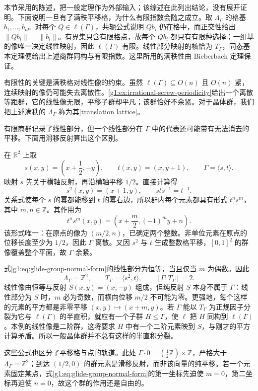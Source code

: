 本节采用\cite[第2节，定义1、命题1及其后说明，第68--69页]{Burde2021Crystallographic}的陈述，把一般定理作为外部输入；该综述在此列出结论，没有展开证明。下面说明一旦有了满秩平移格，为什么有限指数会随之成立。取 \(\Lambda_\Gamma\) 的格基 \(b_1,\ldots,b_n\)。对每个 \(Q\in\ell(\Gamma)\)，共轭公式说明 \(Qb_i\) 仍在格中，而正交性给出 \(\lVert Qb_i\rVert=\lVert b_i\rVert\)。有界集只含有限格点，故每个 \(Qb_i\) 都只有有限种选择；一组基的像唯一决定线性映射，因此 \(\ell(\Gamma)\) 有限。线性部分映射的核恰为 \(T_\Gamma\)，同态基本定理便给出上述商群同构与有限指数。这里所用的满秩性由 Bieberbach 定理保证。

\ProseParagraphBreak

有限性的关键是满秩格对线性像的约束。虽然 \(\ell(\Gamma)\subseteq O(n)\) 且 \(O(n)\) 紧，连续映射的像仍可能失去离散性。\cref{g1:ex:irrational-screw-periodicity}给出一个离散等距群，它的线性像无限，平移子群却平凡；该群恰好不余紧。对于晶体群，我们把上述满秩的 \(\Lambda_\Gamma\) 称为其[translation lattice]。

\ProseParagraphBreak

有限商群记录了线性部分，但一个线性部分在 \(\Gamma\) 中的代表还可能带有无法消去的平移。下面用滑移反射算出这个区别。

\begin{example}
	\label{g1:exm:glide-crystallographic}
	在 \(\mathbb R^2\) 上取
	\[
		s(x,y)=\left(x+\frac12,-y\right),\qquad t(x,y)=(x,y+1),
		\qquad \Gamma=\langle s,t\rangle.
	\]
	映射 \(s\) 先关于横轴反射，再沿横轴平移 \(1/2\)。直接计算得
	\[
		s^2(x,y)=(x+1,y),\qquad sts^{-1}=t^{-1}.
	\]
	关系式使每个 \(s\) 的幂都能移到 \(t\) 的幂右边，所以群内每个元素都具有形式 \(t^ns^m\)，其中 \(m,n\in\mathbb Z\)。其作用为
	\begin{equation}\label{g1:eq:glide-group-normal-form}
		t^ns^m(x,y)=\left(x+\frac m2,(-1)^m y+n\right).
	\end{equation}
	该形式唯一：在原点的像为 \((m/2,n)\)，已确定两个整数。非单位元素在原点的位移长度至少为 \(1/2\)，因此 \(\Gamma\) 离散。又因 \(s^2\) 与 \(t\) 生成整数格平移，\([0,1]^2\) 的群像覆盖整个平面，故 \(\Gamma\) 余紧。

	式\eqref{g1:eq:glide-group-normal-form}的线性部分为恒等，当且仅当 \(m\) 为偶数。因此
	\[
		\Lambda_\Gamma=\mathbb Z^2,\qquad
		T_\Gamma=\langle s^2,t\rangle,\qquad
		[\Gamma:T_\Gamma]=2.
	\]
	线性像由恒等与反射 \(S(x,y)=(x,-y)\) 组成，但纯反射 \(S\) 本身不属于 \(\Gamma\)：线性部分为 \(S\) 时，\(m\) 必为奇数，而横向位移 \(m/2\) 不可能为零。更强地，每个这样的元素的平方都是非零平移 \((x,y)\mapsto(x+m,y)\)。若 \(\Gamma\) 能以 \(T_\Gamma\) 为正规因子分裂为它与 \(\ell(\Gamma)\) 的半直积，就应有一个子群 \(H\le\Gamma\)，使 \(\ell\) 把 \(H\) 同构到 \(\ell(\Gamma)\)。本例的线性像是二阶群，这将要求 \(H\) 中有一个二阶元素映到 \(S\)，与刚才的平方计算矛盾。所以一般晶体群并不总有这样的半直积分裂。

	这些公式也区分了平移格与点的轨道。此处 \(\Gamma\cdot0=(\tfrac12\mathbb Z)\times\mathbb Z\)，严格大于 \(\Lambda_\Gamma=\mathbb Z^2\)；到达 \((1/2,0)\) 的群元素是滑移反射，而非该向量的纯平移。若一个元素固定某点，式\eqref{g1:eq:glide-group-normal-form}的第一坐标先迫使 \(m=0\)，第二坐标再迫使 \(n=0\)，故这个群的作用还是自由的。
\end{example}

